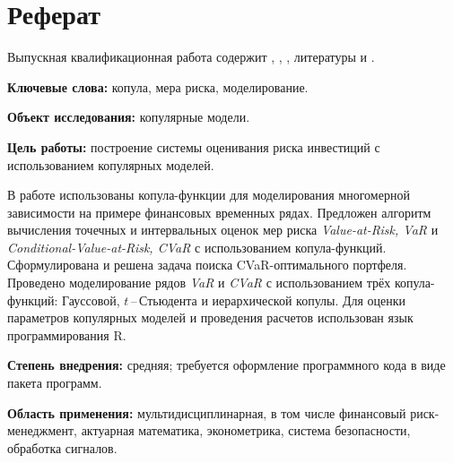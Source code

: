 \section*{Реферат}

Выпускная квалификационная работа содержит , , ,  литературы и .

\textbf{Ключевые слова:} копула, мера риска, моделирование.

\textbf{Объект исследования:} копулярные модели.

\textbf{Цель работы:} построение системы оценивания риска инвестиций с использованием копулярных моделей.

В работе использованы  копула-функции для моделирования многомерной зависимости на примере финансовых временных рядах. 
Предложен алгоритм вычисления точечных и интервальных оценок мер риска \textit{Value-at-Risk, VaR} и \textit{Conditional-Value-at-Risk, CVaR} с использованием копула-функций. 
Сформулирована и решена задача поиска CVaR-оптимального портфеля. 
Проведено моделирование рядов  \textit{VaR} и \textit{CVaR} с использованием трёх копула-функций: Гауссовой, $t$\,--\,Стьюдента и иерархической копулы.
Для оценки параметров копулярных моделей и проведения расчетов  использован язык программирования R. 

\textbf{Степень внедрения:} средняя; требуется оформление программного кода в виде пакета программ.

\textbf{Область применения:} мультидисциплинарная, в том числе финансовый риск-менеджмент, актуарная математика, эконометрика, система безопасности, обработка сигналов.


